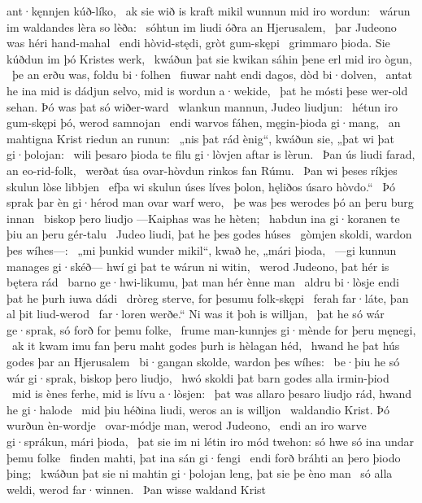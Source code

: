 ant·kęnnjen kúð-líko, \hld\ ak sie wið is kraft mikil
wunnun mid iro wordun: \hld\ wárun im waldandes
lèra so lèða: \hld\ sóhtun im liudi óðra
an Hjerusalem, \hld\ þar Judeono was
héri hand-mahal \hld\ endi hòvid-stędi,
gròt gum-skępi \hld\ grimmaro þioda.
Sie kúðdun im þó Kristes werk, \hld\ kwáðun þat sie kwikan sáhin
þene erl mid iro ògun, \hld\ þe an erðu was,
foldu bi·folhen \hld\ fiuwar naht endi dagos,
dòd bi·dolven, \hld\ antat he ina mid is dádjun selvo,
mid is wordun a·wekide, \hld\ þat he mósti þese wer-old sehan.
Þó was þat só wiðer-ward \hld\ wlankun mannun,
Judeo liudjun: \hld\ hétun iro gum-skępi þó,
werod samnojan \hld\ endi warvos fáhen,
męgin-þioda gi·mang, \hld\ an mahtigna Krist
riedun an runun: \hld\ „nis þat rád ènig“, kwáðun sie,
„þat wi þat gi·þolojan: \hld\ wili þesaro þioda te filu
gi·lòvjen aftar is lèrun. \hld\ Þan ús liudi farad,
an eo-rid-folk, \hld\ werðat úsa ovar-hòvdun
rinkos fan Rúmu. \hld\ Þan wi þeses ríkjes skulun
lòse libbjen \hld\ efþa wi skulun úses líves þolon,
hęliðos úsaro hòvdo.“ \hld\ Þó sprak þar èn gi·hérod man
ovar warf wero, \hld\ þe was þes werodes þó
an þeru burg innan \hld\ biskop þero liudjo
—Kaiphas was he hèten; \hld\ habdun ina gi·koranen te þiu
an þeru gér-talu \hld\ Judeo liudi,
þat he þes godes húses \hld\ gòmjen skoldi,
wardon þes wíhes—: \hld\ „mi þunkid wunder mikil“, kwað he,
„mári þioda, \hld\ —gi kunnun manages gi·skéð—
hwí gi þat te wárun ni witin, \hld\ werod Judeono,
þat hér is bętera rád \hld\ barno ge·hwi-likumu,
þat man hér ènne man \hld\ aldru bi·lòsje
endi þat he þurh iuwa dádi \hld\ dròreg sterve,
for þesumu folk-skępi \hld\ ferah far·láte,
þan al þit liud-werod \hld\ far·loren werðe.“
Ni was it þoh is willjan, \hld\ þat he só wár ge·sprak,
só forð for þemu folke, \hld\ frume man-kunnjes
gi·mènde for þeru męnegi, \hld\ ak it kwam imu fan þeru maht godes
þurh is hèlagan héd, \hld\ hwand he þat hús godes
þar an Hjerusalem \hld\ bi·gangan skolde,
wardon þes wíhes: \hld\ be·þiu he só wár gi·sprak,
biskop þero liudjo, \hld\ hwó skoldi þat barn godes
alla irmin-þiod \hld\ mid is ènes ferhe,
mid is lívu a·lòsjen: \hld\ þat was allaro þesaro liudjo rád,
hwand he gi·halode \hld\ mid þiu héðina liudi,
weros an is willjon \hld\ waldandio Krist.
Þó wurðun èn-wordje \hld\ ovar-módje man,
werod Judeono, \hld\ endi an iro warve gi·sprákun,
mári þioda, \hld\ þat sie im ni létin iro mód twehon:
só hwe só ina undar þemu folke \hld\ finden mahti,
þat ina sán gi·fengi \hld\ endi forð bráhti
an þero þiodo þing; \hld\ kwáðun þat sie ni mahtin gi·þolojan leng,
þat sie þe èno man \hld\ só alla weldi,
werod far·winnen. \hld\ Þan wisse waldand Krist
